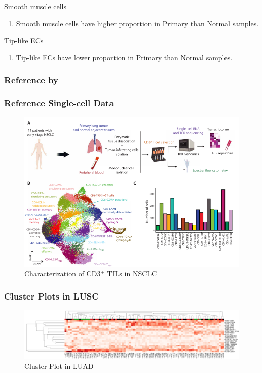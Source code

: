 \documentclass{beamer}
\begin{document}
\begin{frame}[allowframebreaks]
        \begin{block}{Smooth muscle cells}
            \begin{enumerate}
                \item Smooth muscle cells have higher proportion in Primary than Normal samples.
            \end{enumerate}
        \end{block}

        \begin{block}{Tip-like ECs}
            \begin{enumerate}
                \item Tip-like ECs have lower proportion in Primary than Normal samples.
            \end{enumerate}
        \end{block}
    \end{frame}

    \subsubsection{Reference by \protect{}}
    \begin{frame}
        \frametitle{Reference Single-cell Data}

        \begin{figure}
            \includegraphics[width=0.8 \linewidth]{figures/LungCancer/reference_2.png}
            \caption{Characterization of CD3$^+$ TILs in NSCLC \protect\cite{singlecell2}}
        \end{figure}
    \end{frame}

    \begin{frame}
        \frametitle{Cluster Plots in LUSC}

        \begin{figure}
            \includegraphics[width=\linewidth]{figures/BisqueRNA/clustermap/STAR.SQC.GSE162498.cluster.pdf}
            \caption{Cluster Plot in LUAD}
        \end{figure}
    \end{frame}
\end{document}
